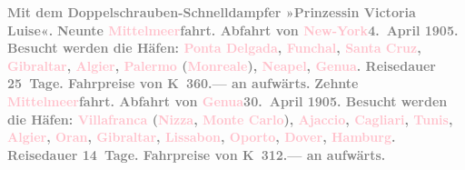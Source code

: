           {\bigskip}\pstart
           \noindent{}\centering{}\textcolor{gray}{\textbf{Mit dem Doppelschrauben-Schnelldampfer »Prinzessin Victoria
                  Luise«.}}\pend
           \pstart
           \noindent{}\textcolor{gray}{\textbf{\textbf{Neunte \textcolor{pink}{Mittelmeer}{}\ledrightnote{\textcolor{pink}{Mittelmeer}}fahrt.}
                  Abfahrt von \textcolor{pink}{New-York}{}\ledrightnote{\textcolor{pink}{New York City}}{ }\textbf{4. April 1905}. Besucht werden die Häfen: \textcolor{pink}{Ponta Delgada}{}\ledrightnote{\textcolor{pink}{Ponta Delgada}},
                     \textcolor{pink}{Funchal}{}\ledrightnote{\textcolor{pink}{Funchal}}, \textcolor{pink}{Santa
                     Cruz}{}\ledrightnote{\textcolor{pink}{Santa Cruz}}, \textcolor{pink}{Gibraltar}{}\ledrightnote{\textcolor{pink}{Gibraltar}}, \textcolor{pink}{Algier}{}\ledrightnote{\textcolor{pink}{Algiers}}, \textcolor{pink}{Palermo}{}\ledrightnote{\textcolor{pink}{Palermo}} (\textcolor{pink}{Monreale}{}\ledrightnote{\textcolor{pink}{Monreale}}), \textcolor{pink}{Neapel}{}\ledrightnote{\textcolor{pink}{Neapel}}, \textcolor{pink}{Genua}{}\ledrightnote{\textcolor{pink}{Genua}}. Reisedauer 25 Tage.
                  Fahrpreise von \textbf{K 360.—} an aufwärts.}}\pend
           \pstart
           \textcolor{gray}{\textbf{\textbf{Zehnte \textcolor{pink}{Mittelmeer}{}\ledrightnote{\textcolor{pink}{Mittelmeer}}fahrt.}
                  Abfahrt von \textcolor{pink}{Genua}{}\ledrightnote{\textcolor{pink}{Genua}}{ }\textbf{30. April 1905}. Besucht werden die Häfen: \textcolor{pink}{Villafranca}{}\ledrightnote{\textcolor{pink}{Villefranche-sur-Mer}}
                     (\textcolor{pink}{Nizza}{}\ledrightnote{\textcolor{pink}{Nizza}}, \textcolor{pink}{Monte
                     Carlo}{}\ledrightnote{\textcolor{pink}{Monte Carlo}}), \textcolor{pink}{Ajaccio}{}\ledrightnote{\textcolor{pink}{Ajaccio}}, \textcolor{pink}{Cagliari}{}\ledrightnote{\textcolor{pink}{Cagliari}}, \textcolor{pink}{Tunis}{}\ledrightnote{\textcolor{pink}{Tunis}}, \textcolor{pink}{Algier}{}\ledrightnote{\textcolor{pink}{Algiers}}, \textcolor{pink}{Oran}{}\ledrightnote{\textcolor{pink}{Oran}},
                     \textcolor{pink}{Gibraltar}{}\ledrightnote{\textcolor{pink}{Gibraltar}}, \textcolor{pink}{Lissabon}{}\ledrightnote{\textcolor{pink}{Lissabon}}, \textcolor{pink}{Oporto}{}\ledrightnote{\textcolor{pink}{Porto}}, \textcolor{pink}{Dover}{}\ledrightnote{\textcolor{pink}{Dover}}, \textcolor{pink}{Hamburg}{}\ledrightnote{\textcolor{pink}{Hamburg}}. Reisedauer
                  14 Tage. Fahrpreise von \textbf{K 312.—} an aufwärts.}}\pend
